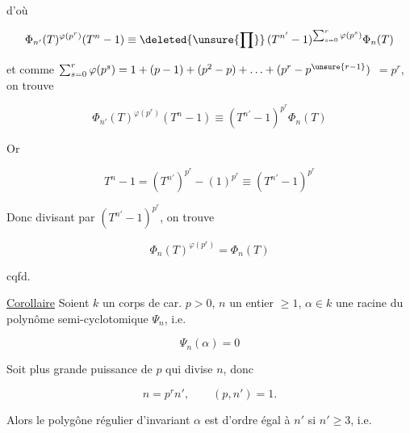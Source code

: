 
d'où

\[
\Phi_{n'}(T)^{\varphi(p^r)}(T^n-1)\equiv\deleted{\unsure{\prod}}\,(T^{n'}-1)^{\sum_{s=0}^r\varphi(p^s)}\Phi_n(T)
\]

et comme $\sum_{s=0}^r\varphi(p^s)=1+(p-1)+(p^2-p)+\ldots+(p^r-p^{\unsure{r-1}})$ $=p^r$, on trouve

\[
\Phi_{n'}(T)^{\varphi(p^r)}(T^n-1)\equiv(T^{n'}-1)^{p^r}\Phi_n(T)
\]

Or

\[
T^n-1=(T^{n'})^{p^r}-(1)^{p^r}\equiv(T^{n'}-1)^{p^r}
\]

 Donc divisant par $(T^{n'}-1)^{p^r}$, on trouve

\[
\Phi_n(T)^{\varphi(p^r)}=\Phi_n(T)
\]

\hfill cqfd.

\uline{Corollaire} Soient $k$ un corps de car. $p>0$, $n$ un entier  $\geq1$, $\alpha\in k$ une racine du polynôme semi-cyclotomique $\Psi_n$, i.e.

\[
\Psi_n(\alpha)=0
\]

Soit   plus grande puissance de $p$ qui divise $n$, donc

\[
n=p^rn',\qquad(p,n')=1.
\]

Alors le polygône régulier d'invariant $\alpha$ est d'ordre égal à $n'$ si $n'\geq3$, i.e.

